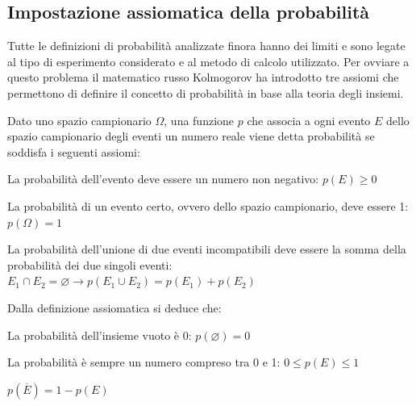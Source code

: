\documentclass{article}     %
\begin{document}
                \subsection{Impostazione assiomatica della probabilità}
                    Tutte le definizioni di probabilità analizzate finora hanno dei limiti e sono legate al tipo di esperimento considerato e al metodo di calcolo utilizzato. Per ovviare a questo problema il matematico russo Kolmogorov ha introdotto tre assiomi che permettono di definire il concetto di probabilità in base alla teoria degli insiemi.
                    \begin{boxdef}
                        Dato uno spazio campionario $\Omega$, una funzione $p$ che associa a ogni evento $E$ dello spazio campionario degli eventi un numero reale viene detta probabilità se soddisfa i seguenti assiomi:
                    \end{boxdef}
                    \begin{axiom}
                        La probabilità dell'evento deve essere un numero non negativo: $p(E) \geq 0$
                    \end{axiom}
                    \begin{axiom}
                        La probabilità di un evento certo, ovvero dello spazio campionario, deve essere 1: $p(\Omega)=1$
                    \end{axiom}
                    \begin{axiom}
                        La probabilità dell'unione di due eventi incompatibili deve essere la somma della probabilità dei due singoli eventi: $E_1\cap E_2 =\varnothing \rightarrow p(E_1\cup E_2)=p(E_1)+p(E_2)$ 
                    \end{axiom}
                    Dalla definizione assiomatica si deduce che:
                    \begin{corollary}
                        La probabilità dell'insieme vuoto è 0: $p(\varnothing)=0$
                    \end{corollary}
                    \begin{corollary}
                        La probabilità è sempre un numero compreso tra 0 e 1: $0\leq p(E)\leq 1$
                    \end{corollary}
                    \begin{corollary}
                        $p(\overline{E})=1-p(E)$
                    \end{corollary}
\end{document}
